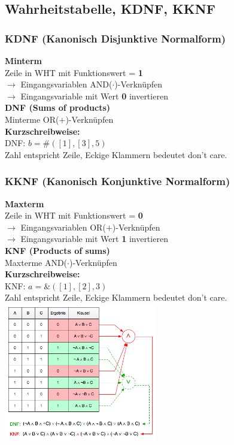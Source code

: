 \subsection{Wahrheitstabelle, KDNF, KKNF}
\begin{multicols}{2}
\subsubsection{KDNF (Kanonisch  Disjunktive Normalform)}
\vspace{-5pt}
\textbf{Minterm}$~~$ \\
Zeile in WHT mit Funktionswert = \textbf{1}\\
$\rightarrow$ Eingangsvariablen AND($\cdot$)-Verknüpfen \\
$\rightarrow $ Eingangsvariable mit Wert \textbf{0} invertieren\\
\textbf{DNF (Sums of products)}\\
Minterme OR($+$)-Verknüpfen\\
\textbf{Kurzschreibweise:}\\
DNF: $ b = \#([1],[3],5) $ \\
Zahl entspricht Zeile, Eckige Klammern bedeutet don't care.\\ 

\subsubsection{KKNF (Kanonisch Konjunktive Normalform)}
\vspace{-5pt}
\textbf{Maxterm}$~~$ \\
Zeile in WHT mit Funktionswert = \textbf{0}\\
$\rightarrow$ Eingangsvariablen OR($+$)-Verknüpfen \\
$\rightarrow $ Eingangsvariable mit Wert \textbf{1} invertieren\\
\textbf{KNF (Products of sums)}\\
Maxterme AND($\cdot$)-Verknüpfen\\
\textbf{Kurzschreibweise:}\\
KNF: $ a = \&([1],[2],3) $ \\
Zahl entspricht Zeile, Eckige Klammern bedeutet don't care.\\ 

\includegraphics[width=0.5\textwidth]{pics/KNFDNF}
\end{multicols}

